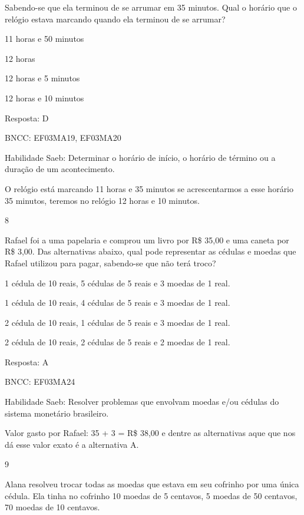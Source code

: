 \begin{escolha}
{\begin{escolha}
{Sabendo-se que ela terminou de se arrumar em 35 minutos. Qual o horário
que o relógio estava marcando quando ela terminou de se arrumar?

\begin{escolha}

\item
  11 horas e 50 minutos
\item
  12 horas
\item
  12 horas e 5 minutos
\item
  12 horas e 10 minutos
\end{escolha}

Resposta: D

BNCC: EF03MA19, EF03MA20

Habilidade Saeb: Determinar o horário de início, o horário de término ou
a duração de um acontecimento.

O relógio está marcando 11 horas e 35 minutos se acrescentarmos a esse
horário 35 minutos, teremos no relógio 12 horas e 10 minutos.

\num{8}

Rafael foi a uma papelaria e comprou um livro por R\$ 35,00 e uma caneta
por R\$ 3,00. Das alternativas abaixo, qual pode representar as cédulas
e moedas que Rafael utilizou para pagar, sabendo-se que não terá troco?

\begin{escolha}

\item
  1 cédula de 10 reais, 5 cédulas de 5 reais e 3 moedas de 1 real.
\item
  1 cédula de 10 reais, 4 cédulas de 5 reais e 3 moedas de 1 real.
\item
  2 cédula de 10 reais, 1 cédulas de 5 reais e 3 moedas de 1 real.
\item
  2 cédula de 10 reais, 2 cédulas de 5 reais e 2 moedas de 1 real.
\end{escolha}

Resposta: A

BNCC: EF03MA24

Habilidade Saeb: Resolver problemas que envolvam moedas e/ou cédulas do
sistema monetário brasileiro.

Valor gasto por Rafael: 35 + 3 = R\$ 38,00 e dentre as alternativas aque
que nos dá esse valor exato é a alternativa A.

\num{9}

Alana resolveu trocar todas as moedas que estava em seu cofrinho por uma
única cédula. Ela tinha no cofrinho 10 moedas de 5 centavos, 5 moedas de
50 centavos, 70 moedas de 10 centavos.

}
\end{escolha}}
\end{escolha}
